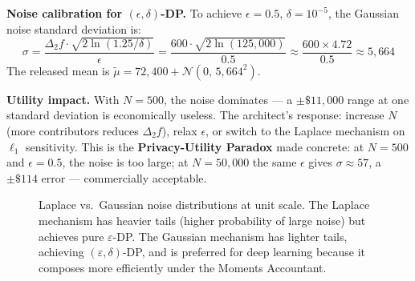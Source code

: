 \textbf{Noise calibration for $(\epsilon, \delta)$-DP.}
To achieve $\epsilon = 0.5$, $\delta = 10^{-5}$, the Gaussian noise standard deviation is:
\begin{equation}
  \sigma = \frac{\Delta_2 f \cdot \sqrt{2 \ln(1.25/\delta)}}{\epsilon}
          = \frac{600 \cdot \sqrt{2 \ln(125{,}000)}}{0.5}
          \approx \frac{600 \times 4.72}{0.5} \approx 5{,}664
\end{equation}
The released mean is $\tilde{\mu} = 72{,}400 + \mathcal{N}(0,\, 5{,}664^2)$.

\textbf{Utility impact.} With $N=500$, the noise dominates — a $\pm\$11{,}000$ range at one standard deviation is economically useless. The architect's response: increase $N$ (more contributors reduces $\Delta_2 f$), relax $\epsilon$, or switch to the Laplace mechanism on $\ell_1$ sensitivity. This is the \textbf{Privacy-Utility Paradox} made concrete: at $N=500$ and $\epsilon=0.5$, the noise is too large; at $N=50{,}000$ the same $\epsilon$ gives $\sigma \approx 57$, a $\pm \$114$ error — commercially acceptable.

\begin{figure}[ht]
\centering
{}
\caption{Laplace vs.\ Gaussian noise distributions at unit scale. The Laplace mechanism has heavier tails (higher probability of large noise) but achieves pure $\varepsilon$-DP. The Gaussian mechanism has lighter tails, achieving $(\varepsilon, \delta)$-DP, and is preferred for deep learning because it composes more efficiently under the Moments Accountant.}
\label{fig:ch5_noise_comparison}
\end{figure}

